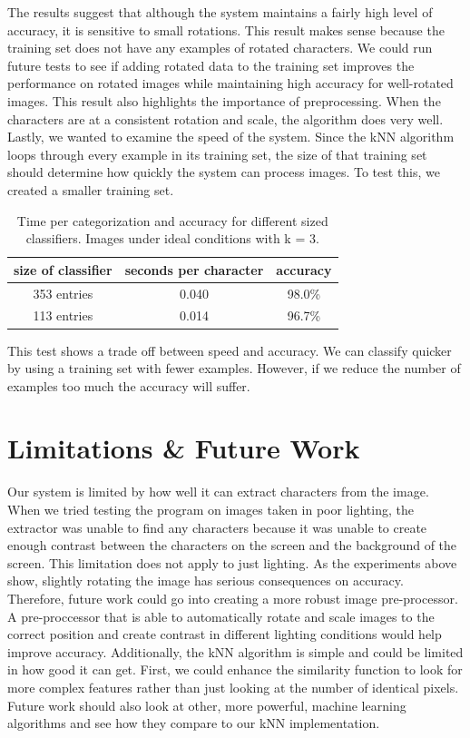 \documentclass[a4paper,12pt]{article}
\begin{document}
The results suggest that although the system maintains a fairly high level of accuracy, it is sensitive to small rotations. This result makes sense because the training set does not have any examples of rotated characters. We could run future tests to see if adding rotated data to the training set improves the performance on rotated images while maintaining high accuracy for well-rotated images. This result also highlights the importance of preprocessing. When the characters are at a consistent rotation and scale, the algorithm does very well. \\

Lastly, we wanted to examine the speed of the system. Since the kNN algorithm loops through every example in its training set, the size of that training set should determine how quickly the system can process images. To test this, we created a smaller training set. \\

\begin{table}[h]
  \centering
  \begin{tabular}{c|c|c}
      size of classifier & seconds per character & accuracy \\ \hline
      353 entries & 0.040 & 98.0\% \\
      113 entries & 0.014 & 96.7\% \\
  \end{tabular}
  \caption{Time per categorization and accuracy for different sized classifiers. Images under ideal conditions with k = 3.}
  \label{table:size_v_time}
\end{table}

This test shows a trade off between speed and accuracy. We can classify quicker by using a training set with fewer examples. However, if we reduce the number of examples too much the accuracy will suffer.

\section{Limitations \& Future Work}
Our system is limited by how well it can extract characters from the image. When we tried testing the program on images taken in poor lighting, the extractor was unable to find any characters because it was unable to create enough contrast between the characters on the screen and the background of the screen. This limitation does not apply to just lighting. As the experiments above show, slightly rotating the image has serious consequences on accuracy. Therefore, future work could go into creating a more robust image pre-processor. A pre-proccessor that is able to automatically rotate and scale images to the correct position and create contrast in different lighting conditions would help improve accuracy. Additionally, the kNN algorithm is simple and could be limited in how good it can get. First, we could enhance the similarity function to look for more complex features rather than just looking at the number of identical pixels. Future work should also look at other, more powerful, machine learning algorithms and see how they compare to our kNN implementation. \\
\end{document}
